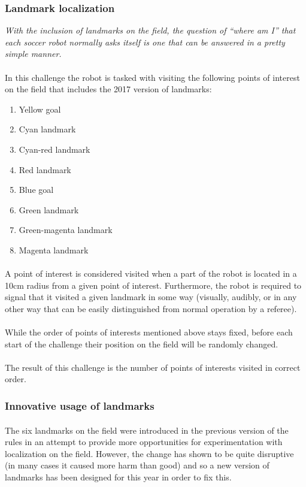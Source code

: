 \documentclass{article}
\newcommand*{\p}{\paragraph{}}
\begin{document}
\subsubsection{Landmark localization}

\textit{With the inclusion of landmarks on the field, the
question of “where am I” that each soccer robot normally asks itself is
one that can be answered in a pretty simple manner.}

\p In this challenge the robot is tasked with visiting the
    following points of interest on the field that includes the 2017 version of
    landmarks:

\begin{enumerate}
    \item Yellow goal
    \item Cyan landmark
    \item Cyan-red landmark
    \item Red landmark
    \item Blue goal
    \item Green landmark
    \item Green-magenta landmark
    \item Magenta landmark
\end{enumerate}

\p A point of interest is considered visited when a part of the
    robot is located in a 10cm radius from a given point of interest.
    Furthermore, the robot is required to signal that it visited a given
    landmark in some way (visually, audibly, or in any other way that can be
    easily distinguished from normal operation by a referee).

\p While the order of points of interests mentioned above stays
    fixed, before each start of the challenge their position on the field will
    be randomly changed.

\p The result of this challenge is the number of points of
    interests visited in correct order.

\subsubsection{Innovative usage of landmarks}

\p The six landmarks on the field were introduced in the previous
    version of the rules in an attempt to provide more opportunities for
    experimentation with localization on the field. However, the change has
    shown to be quite disruptive (in many cases it caused more harm than good)
    and so a new version of landmarks has been designed for this year in order
    to fix this.
\end{document}
